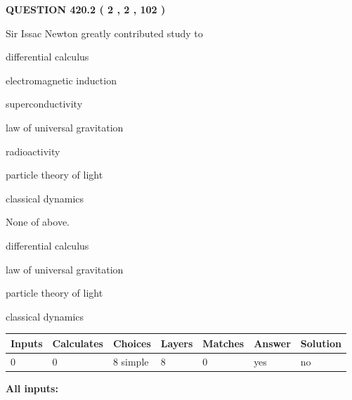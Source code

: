 \documentclass[12pt]{article}
\begin{document}
\vspace{0.2in}
  
{\textbf{\Large{QUESTION
420.2 
 ( 2 , 2 , 102 )
}}}
  
  
Sir Issac Newton greatly contributed study to
 
 
differential calculus
 
 
electromagnetic induction
 
 
superconductivity
 
 
law of universal gravitation
 
 
radioactivity
 
 
particle theory of light
 
 
classical dynamics
 
 
 None of above.
 
 
\noindent{}
 
 
differential calculus
 
 
law of universal gravitation
 
 
particle theory of light
 
 
classical dynamics
 
 
\noindent{}
 
 
   
   
   
   
\noindent\begin{tabular}{|l|l|l|l|l|l|l|}
 \hline
Inputs & Calculates & Choices & Layers & Matches & Answer & Solution \\ \hline
 0  & 
 0  & 
 8
  simple  
  & 
 8  & 
 0  & 
  yes & 
  no 
  \\ \hline
 \end{tabular}
   
   
   
   
\noindent{}
   
   
   
   
\noindent\vspace{0.1in}\hspace{-0.08in} {\textbf{\Large{All inputs: }}}
   
\end{document}

